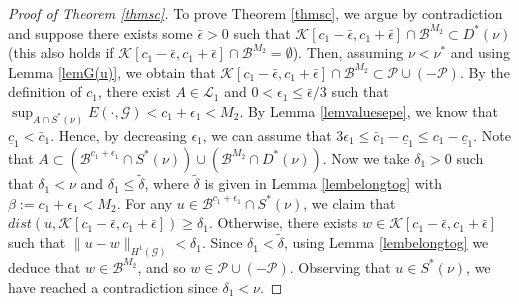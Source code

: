 \documentclass[10pt,a4paper]{article}
\theoremstyle{definition} \theoremstyle{remark}
\numberwithin{equation}{section}
\newcommand{\G}{\mathcal{G}}
\newcommand{\B}{\mathcal{B}}
\newcommand{\K}{\mathcal{K}}
\newcommand{\p}{\mathcal{P}}
\begin{document}
\begin{proof} [Proof of Theorem \ref{thmsc}]
To prove Theorem \ref{thmsc}, we argue by contradiction and suppose there exists some $\bar{\epsilon} > 0$ such that $\K[c_1-\bar{\epsilon},c_1+\bar{\epsilon}] \cap \B^{M_2} \subset D^*(\nu)$ (this also holds if $\K[c_1-\bar{\epsilon},c_1+\bar{\epsilon}] \cap \B^{M_2} = \emptyset$). Then, assuming $\nu < \nu^*$ and using Lemma \ref{lemG(u)}, we obtain that $\K[c_1-\bar{\epsilon},c_1+\bar{\epsilon}] \cap \B^{M_2} \subset \p \cup (-\p)$. By the definition of $c_1$, there exist $A \in \mathcal{L}_1$ and $0 < \epsilon_1 \leq \bar{\epsilon}/3$ such that $\sup_{A \cap S^*(\nu)}E(\cdot,\G) < c_1 + \epsilon_1 < M_2$. By Lemma \ref{lemvaluesepe}, we know that $\underline{c}_1 < \bar{c}_1$. Hence, by decreasing $\epsilon_1$, we can assume that $3\epsilon_1 \leq \bar{c}_1 - \underline{c}_1 \leq c_1 - \underline{c}_1$. Note that $A \subset (\B^{c_1 + \epsilon_1} \cap S^*(\nu)) \cup (\B^{M_2} \cap D^*(\nu))$. Now we take $\delta_1 > 0$ such that $\delta_1 < \nu$ and $\delta_1 \leq \tilde \delta$, where $\tilde \delta$ is given in Lemma \ref{lembelongtog} with $\beta := c_1 + \epsilon_1 < M_2$. For any $u \in \B^{c_1 + \epsilon_1} \cap S^*(\nu)$, we claim that $dist(u,\K[c_1-\bar{\epsilon},c_1+\bar{\epsilon}]) \geq \delta_1$. Otherwise, there exists $w \in \K[c_1-\bar{\epsilon},c_1+\bar{\epsilon}]$ such that $\|u - w\|_{H^1(\G)} < \delta_1$. Since $\delta_1 < \tilde \delta$, using Lemma \ref{lembelongtog} we deduce that $w \in \B^{M_2}$, and so $w \in \p \cup (-\p)$. Observing that $u \in S^*(\nu)$, we have reached a contradiction since $\delta_1 < \nu$. 


\end{proof}
\end{document}
